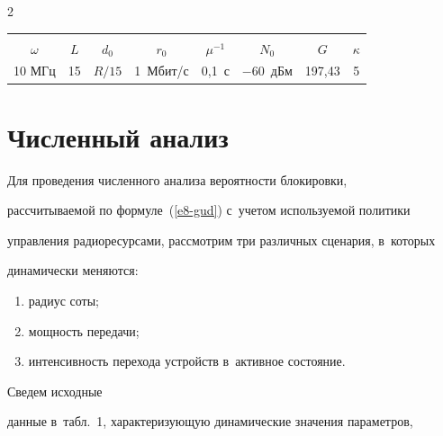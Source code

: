 \begin{multicols}{2}
\begin{table}
\begin{center}
\begin{tabular}{|c|c|c|c|c|c|c|c|}


\hline


&&&&&&&\\[-9pt]


$\omega$&$L$&$d_0$&$r_0$&$\mu^{-1}$&$N_0$&$G$&$\kappa$\\


\hline


10 МГц&15&$R/15$&1~Мбит/с&0,1~с&$-60$~дБм&197,43&5\\


\hline


\end{tabular}


\end{center}


\vspace*{-6pt}


\end{table}


  


\section{Численный анализ}





  Для проведения численного анализа веро\-ят\-ности блокировки, 


рассчитываемой по формуле~(\ref{e8-gud}) с~учетом используемой политики 


управления радиоресурсами, рассмотрим три различных сценария, в~которых 


динамически меняются: 


\begin{enumerate}[(1)]


\item радиус соты; 


\item мощность передачи; 


\item интенсивность перехода устройств в~активное состояние. 


\end{enumerate}





Сведем исходные 


данные в~табл.~1, характеризующую динамические значения параметров, 



\end{multicols}

